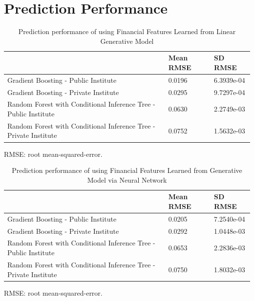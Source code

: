 \documentclass[11pt,letter]{article}
\begin{document}
\appendix
\renewcommand\thetable{\thesection\arabic{table}}

\setcounter{table}{0}
\setcounter{table}{0}
\renewcommand{\thetable}{A\arabic{table}}




\section{Prediction Performance}

\begin{table}[H]
\centering
\begin{tabular}{|l|l|l|}
         \hline                                                 & Mean RMSE\footnotemark[1] & SD RMSE   \\
         \hline 
Gradient Boosting - Public Institute                              & 0.0196    & 6.3939e-04 \\
Gradient Boosting - Private Institute                             & 0.0295    & 9.7297e-04 \\
\hline
Random Forest with Conditional Inference Tree - Public Institute  & 0.0630    & 2.2749e-03 \\
Random Forest with Conditional Inference Tree - Private Institute & 0.0752    & 1.5632e-03 \\
\hline
\end{tabular}
\caption{Prediction performance of using Financial Features Learned from Linear Generative Model}\label{tab:MSElinear}
\begin{flushleft}\small\footnotemark[1]RMSE: root mean-squared-error.
\end{flushleft}
\end{table}

\begin{table}[H]
\centering
\begin{tabular}{|l|l|l|}
              \hline                                                    & Mean RMSE\footnotemark[1] & SD RMSE    \\
              \hline
Gradient Boosting - Public Institute                              & 0.0205          & 7.2540e-04
 \\
Gradient Boosting - Private Institute                             & 0.0292           & 1.0448e-03\\
\hline
Random Forest with Conditional Inference Tree - Public Institute  & 0.0653            & 2.2836e-03
 \\
Random Forest with Conditional Inference Tree - Private Institute &0.0750           & 1.8032e-03 \\
\hline
\end{tabular}
\caption{Prediction performance of using Financial Features Learned from Generative Model via Neural Network} \label{tab:MSENN}
\begin{flushleft}\small\footnotemark[1]RMSE: root mean-squared-error.
\end{flushleft}
\end{table}
\end{document}
